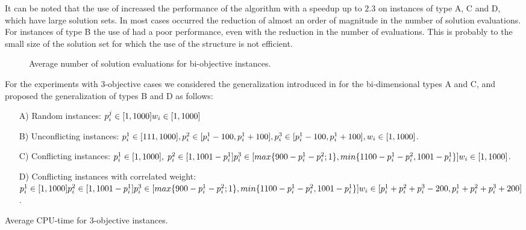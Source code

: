 It can be noted that the use of  
increased the performance of
the algorithm with a speedup up to $2.3$ on instances
of type A, C and D, which have large solution sets.
In most cases occurred the reduction of almost
an order of magnitude in the number of solution evaluations.
For instances of type B the use of  had a poor performance,
even with the reduction in the number of evaluations.
This is probably to the small size of the solution set
for which the use of the structure is not efficient.

\begin{figure}[]
  
  \caption{Average number of solution evaluations for bi-objective instances.}
  \label{fig:cmp2dim}
\end{figure}

For the experiments with $3$-objective cases
we considered the generalization introduced in \cite{bazgan2009}
for the bi-dimensional types A and C,
and proposed the generalization of types B and D as follows:
\begin{enumerate}
  \item[A)] Random instances: $
    p^j_i \in [1, 1000]\\
    w_i \in [1,1000]$
  \item[B)] Unconflicting instances: $
    p^1_i \in [111, 1000],\\
    p^2_i \in [p^1_i - 100, p^1_i + 100],\\
    p^3_i \in [p^1_i - 100, p^1_i + 100],\\
    w_i \in [1,1000]$.
  \item[C)] Conflicting instances: $
    p^1_i \in [1, 1000], \;
    p^2_i \in [1, 1001 - p^1_i] \\
    p^3_i \in [max\{900-p^1_i-p^2_i;1\}, min\{1100-p^1_i-p^2_i, 1001-p^1_i\}]\\
    w_i \in [1,1000]$.
  \item[D)] Conflicting instances with correlated weight: $
    p^1_i \in [1, 1000]\\
    p^2_i \in [1, 1001 - p^1_i] \\
    p^3_i \in [max\{900-p^1_i-p^2_i;1\}, min\{1100-p^1_i-p^2_i, 1001-p^1_i\}]\\
    w_i \in [p^1_i+p^2_i+p^3_i-200, p^1_i+p^2_i+p^3_i+200]$.
\end{enumerate}

\begin{table}[]
  \centering
  
  \caption{Average CPU-time for 3-objective instances.}
  \label{tab:cpu3dim}
\end{table}

